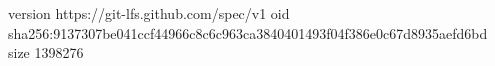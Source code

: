 version https://git-lfs.github.com/spec/v1
oid sha256:9137307be041ccf44966c8c6c963ca3840401493f04f386e0c67d8935aefd6bd
size 1398276
